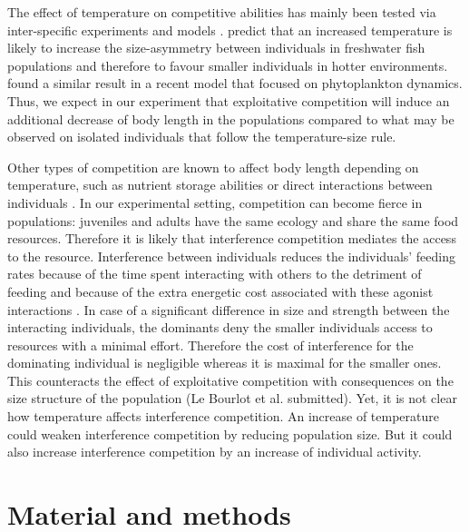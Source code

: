 The effect of temperature on competitive abilities has mainly been tested via
inter-specific experiments \autocites{park1954a,tilman1981competition} and
models \autocites{vasseur2005a,gilman2010framework}.
\textcites{ohlberger2012a} predict that an increased temperature is likely to
increase the size-asymmetry between individuals in freshwater fish populations
and therefore to favour smaller individuals in hotter environments.
\textcites{reuman2014metabolic} found a similar result in a recent model that
focused on phytoplankton dynamics. Thus, we expect in our experiment that
exploitative competition will induce an additional decrease of body length in
the populations compared to what may be observed on isolated individuals that
follow the temperature-size rule.

Other types of competition are known to affect body length depending on
temperature, such as nutrient storage abilities
\autocites{litchman2009contrasting} or direct interactions between individuals
\autocites{park1962a,schoener1983a,anholt1990a,smallegange2006a,nakayama2010a,mccormick2012a}.
In our experimental setting, competition can become fierce in populations:
juveniles and adults have the same ecology and share the same food resources.
Therefore it is likely that interference competition mediates the access to the
resource. Interference between individuals reduces the individuals’ feeding
rates because of the time spent interacting with others to the detriment of
feeding \autocites{smallegange2006a} and because of the extra energetic
cost associated with these agonist interactions \autocites{briffa2007a}.
In case of a significant difference in size and strength between the interacting individuals, the
dominants deny the smaller individuals access to resources with a minimal
effort. Therefore the cost of interference for the dominating individual is
negligible whereas it is maximal for the smaller ones.
This counteracts the effect of exploitative competition with consequences on the
size structure of the population (Le Bourlot et al. submitted). Yet, it is not
clear how temperature affects interference competition. An increase of
temperature could weaken interference competition by reducing population size.
But it could also increase interference competition by an increase of individual
activity.


\section{Material and methods}

